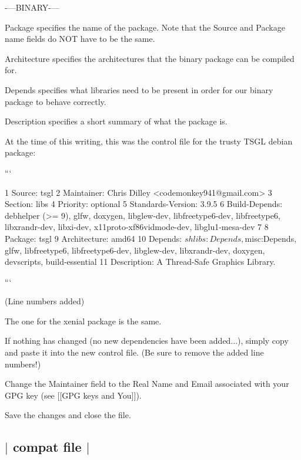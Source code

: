 -\/---B\-I\-N\-A\-R\-Y-\/---


\begin{DoxyItemize}
\item {\ttfamily Package} specifies the name of the package. Note that the Source and Package name fields do N\-O\-T have to be the same.
\item {\ttfamily Architecture} specifies the architectures that the binary package can be compiled for.
\item {\ttfamily Depends} specifies what libraries need to be present in order for our binary package to behave correctly.
\item {\ttfamily Description} specifies a short summary of what the package is.
\end{DoxyItemize}

At the time of this writing, this was the {\ttfamily control} file for the {\ttfamily trusty} T\-S\-G\-L debian package\-:

``` \begin{DoxyVerb}1 Source: tsgl
2 Maintainer: Chris Dilley <codemonkey941@gmail.com>
3 Section: libs
4 Priority: optional
5 Standards-Version: 3.9.5
6 Build-Depends: debhelper (>= 9), glfw, doxygen, libglew-dev, libfreetype6-dev, libfreetype6, libxrandr-dev, libxi-dev, x11proto-xf86vidmode-dev, libglu1-mesa-dev
7
8  Package: tsgl
9 Architecture: amd64
10 Depends: ${shlibs:Depends}, ${misc:Depends}, glfw, libfreetype6, libfreetype6-dev, libglew-dev, libxrandr-dev, doxygen, devscripts, build-essential 
11 Description: A Thread-Safe Graphics Library.
\end{DoxyVerb}


```

(Line numbers added)

The one for the {\ttfamily xenial} package is the same.

If nothing has changed (no new dependencies have been added...), simply copy and paste it into the new {\ttfamily control} file. (Be sure to remove the added line numbers!)

Change the {\ttfamily Maintainer} field to the Real Name and Email associated with your G\-P\-G key (see \mbox{[}\mbox{[}G\-P\-G keys and You\mbox{]}\mbox{]}).

Save the changes and close the file. 

 \subsection*{$\vert$ {\ttfamily compat} file $\vert$ }

